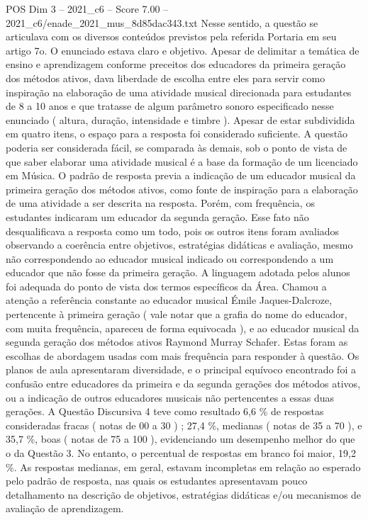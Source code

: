 \begin{textsample}{POS Dim 3 – 2021\_c6 – Score 7.00 – 2021\_c6/enade\_2021\_mus\_8d85dac343.txt}
Nesse sentido, a questão se articulava com os diversos conteúdos previstos pela referida Portaria em seu artigo 7o.
O enunciado estava claro e objetivo.
Apesar de delimitar a temática de ensino e aprendizagem conforme preceitos dos educadores da primeira geração dos métodos ativos, dava liberdade de escolha entre eles para servir como inspiração na elaboração de uma atividade musical direcionada para estudantes de 8 a 10 anos e que tratasse de algum parâmetro sonoro especificado nesse enunciado ( altura, duração, intensidade e timbre ).
Apesar de estar subdividida em quatro itens, o espaço para a resposta foi considerado suficiente.
A questão poderia ser considerada fácil, se comparada às demais, sob o ponto de vista de que saber elaborar uma atividade musical é a base da formação de um licenciado em Música.
O padrão de resposta previa a indicação de um educador musical da primeira geração dos métodos ativos, como fonte de inspiração para a elaboração de uma atividade a ser descrita na resposta.
Porém, com frequência, os estudantes indicaram um educador da segunda geração.
Esse fato não desqualificava a resposta como um todo, pois os outros itens foram avaliados observando a coerência entre objetivos, estratégias didáticas e avaliação, mesmo não correspondendo ao educador musical indicado ou correspondendo a um educador que não fosse da primeira geração.
A linguagem adotada pelos alunos foi adequada do ponto de vista dos termos específicos da Área.
Chamou a atenção a referência constante ao educador musical Émile Jaques-Dalcroze, pertencente à primeira geração ( vale notar que a grafia do nome do educador, com muita frequência, apareceu de forma equivocada ), e ao educador musical da segunda geração dos métodos ativos Raymond Murray Schafer.
Estas foram as escolhas de abordagem usadas com mais frequência para responder à questão.
Os planos de aula apresentaram diversidade, e o principal equívoco encontrado foi a confusão entre educadores da primeira e da segunda gerações dos métodos ativos, ou a indicação de outros educadores musicais não pertencentes a essas duas gerações.
A Questão Discursiva 4 teve como resultado 6,6 \% de respostas consideradas fracas ( notas de 00 a 30 ) ; 27,4 \%, medianas ( notas de 35 a 70 ), e 35,7 \%, boas ( notas de 75 a 100 ), evidenciando um desempenho melhor do que o da Questão 3.
No entanto, o percentual de respostas em branco foi maior, 19,2 \%.
As respostas medianas, em geral, estavam incompletas em relação ao esperado pelo padrão de resposta, nas quais os estudantes apresentavam pouco detalhamento na descrição de objetivos, estratégias didáticas e/ou mecanismos de avaliação de aprendizagem.

\end{textsample}
